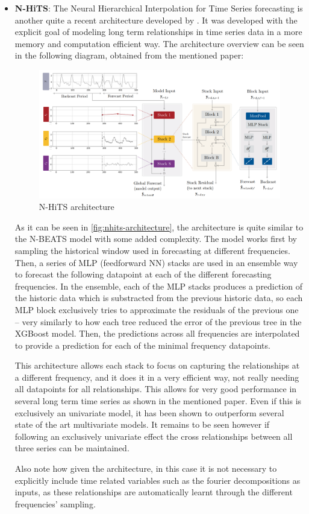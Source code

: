 \begin{itemize}
    \item \textbf{N-HiTS}: The Neural Hierarchical Interpolation for Time Series forecasting is another quite a recent architecture developed by \cite{challu_olivares_oreshkin_garza_2022}. It was developed with the explicit goal of modeling long term relationships in time series data in a more memory and computation efficient way. The architecture overview can be seen in the following diagram, obtained from the mentioned paper:
    \begin{figure}[ht]
        \centering
        \captionsetup{justification=centering}
        \includegraphics[width=\linewidth]{assets/nhits-architecture.png}
        \caption{N-HiTS architecture}
        \label{fig:nhits-architecture}
    \end{figure}
    As it can be seen in \autoref{fig:nhits-architecture}, the architecture is quite similar to the N-BEATS model with some added complexity. The model works first by sampling the historical window used in forecasting at different frequencies. Then, a series of MLP (feedforward NN) stacks are used in an ensemble way to forecast the following datapoint at each of the different forecasting frequencies. In the ensemble, each of the MLP stacks produces a prediction of the historic data which is substracted from the previous historic data, so each MLP block exclusively tries to approximate the residuals of the previous one -- very similarly to how each tree reduced the error of the previous tree in the XGBoost model. Then, the predictions across all frequencies are interpolated to provide a prediction for each of the minimal frequency datapoints. 
    
    This architecture allows each stack to focus on capturing the relationships at a different frequency, and it does it in a very efficient way, not really needing all datapoints for all relationships. This allows for very good performance in several long term time series as shown in the mentioned paper. Even if this is exclusively an univariate model, it has been shown to outperform several state of the art multivariate models. It remains to be seen however if following an exclusively univariate effect the cross relationships between all three series can be maintained.
    
    Also note how given the architecture, in this case it is not necessary to explicitly include time related variables such as the fourier decompositions as inputs, as these relationships are automatically learnt through the different frequencies' sampling.
\end{itemize}
